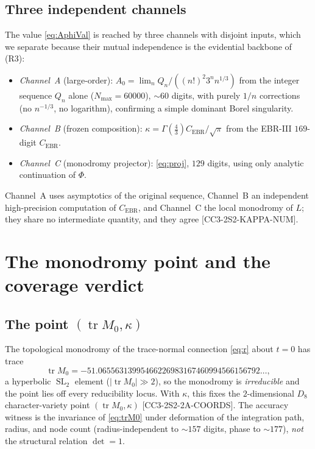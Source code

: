 \documentclass[11pt,reqno]{amsart}
\theoremstyle{plain}
\theoremstyle{definition}
\theoremstyle{remark}
\newcommand{\SL}{\operatorname{SL}}
\newcommand{\tr}{\operatorname{tr}}
\newcommand{\Cebr}{C_{\mathrm{EBR}}}
\newcommand{\claim}[1]{\textsf{\small[#1]}}
\begin{document}
\subsection{Three independent channels}\label{sec:channels}
The value \eqref{eq:AphiVal} is reached by three channels with disjoint inputs,
which we separate because their mutual independence is the evidential backbone
of (R3):
\begin{itemize}
\item \emph{Channel~A} (large-order): $A_{0}=\lim_{n}Q_{n}/((n!)^{2}3^{n}
n^{1/3})$ from the integer sequence $Q_{n}$ alone ($N_{\max}=60000$), $\sim\!60$
digits, with purely $1/n$ corrections (no $n^{-1/3}$, no logarithm), confirming
a simple dominant Borel singularity.
\item \emph{Channel~B} (frozen composition): $\kappa=\Gamma(\tfrac43)\Cebr/
\sqrt\pi$ from the EBR-III $169$-digit $\Cebr$.
\item \emph{Channel~C} (monodromy projector): \eqref{eq:proj}, $129$ digits,
using only analytic continuation of $\Phi$.
\end{itemize}
Channel~A uses asymptotics of the original sequence, Channel~B an independent
high-precision computation of $\Cebr$, and Channel~C the local monodromy of
$L$; they share no intermediate quantity, and they agree
\claim{CC3-2S2-KAPPA-NUM}.

\section{The monodromy point and the coverage verdict}\label{sec:point}

\subsection{The point $(\tr M_{0},\kappa)$}\label{sec:pointval}
The topological monodromy of the trace-normal connection \eqref{eq:r} about
$t=0$ has trace
\begin{equation}\label{eq:trM0}
  \tr M_{0}=-51.06556313995466226983167460994566156792\ldots,
\end{equation}
a hyperbolic $\SL_{2}$ element ($|\tr M_{0}|\gg2$), so the monodromy is
\emph{irreducible} and the point lies off every reducibility locus. With
$\kappa$, this fixes the $2$-dimensional $D_{8}$ character-variety point
$(\tr M_{0},\kappa)$ \claim{CC3-2S2-2A-COORDS}. The accuracy witness is the
invariance of \eqref{eq:trM0} under deformation of the integration path,
radius, and node count (radius-independent to $\sim\!157$ digits, phase to
$\sim\!177$), \emph{not} the structural relation $\det=1$.
\end{document}
